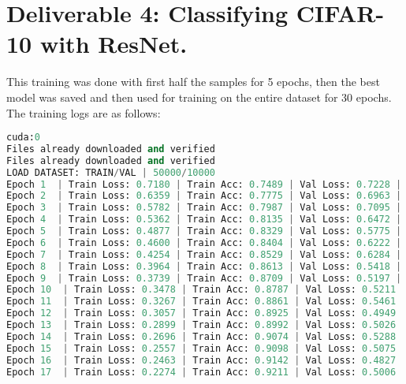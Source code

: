 
\section{Deliverable 4: Classifying CIFAR-10 with ResNet.}


\begin{solve}   
This training was done with first half the samples for 5 epochs, then the best model was saved and then used for training on the entire dataset for 30 epochs. The training logs are as follows:

\begin{lstlisting}[language=python, title=Train Logs, basicstyle=\tiny]
cuda:0
Files already downloaded and verified
Files already downloaded and verified
LOAD DATASET: TRAIN/VAL | 50000/10000
Epoch 1  | Train Loss: 0.7180 | Train Acc: 0.7489 | Val Loss: 0.7228 | Val Acc: 0.7457 | Best Val Loss: 0.7228
Epoch 2  | Train Loss: 0.6359 | Train Acc: 0.7775 | Val Loss: 0.6963 | Val Acc: 0.7637 | Best Val Loss: 0.6963
Epoch 3  | Train Loss: 0.5782 | Train Acc: 0.7987 | Val Loss: 0.7095 | Val Acc: 0.7642 | Best Val Loss: 0.6963
Epoch 4  | Train Loss: 0.5362 | Train Acc: 0.8135 | Val Loss: 0.6472 | Val Acc: 0.7796 | Best Val Loss: 0.6472
Epoch 5  | Train Loss: 0.4877 | Train Acc: 0.8329 | Val Loss: 0.5775 | Val Acc: 0.7978 | Best Val Loss: 0.5775
Epoch 6  | Train Loss: 0.4600 | Train Acc: 0.8404 | Val Loss: 0.6222 | Val Acc: 0.7878 | Best Val Loss: 0.5775
Epoch 7  | Train Loss: 0.4254 | Train Acc: 0.8529 | Val Loss: 0.6284 | Val Acc: 0.7884 | Best Val Loss: 0.5775
Epoch 8  | Train Loss: 0.3964 | Train Acc: 0.8613 | Val Loss: 0.5418 | Val Acc: 0.8159 | Best Val Loss: 0.5418
Epoch 9  | Train Loss: 0.3739 | Train Acc: 0.8709 | Val Loss: 0.5197 | Val Acc: 0.8262 | Best Val Loss: 0.5197
Epoch 10  | Train Loss: 0.3478 | Train Acc: 0.8787 | Val Loss: 0.5211 | Val Acc: 0.8255 | Best Val Loss: 0.5197
Epoch 11  | Train Loss: 0.3267 | Train Acc: 0.8861 | Val Loss: 0.5461 | Val Acc: 0.8205 | Best Val Loss: 0.5197
Epoch 12  | Train Loss: 0.3057 | Train Acc: 0.8925 | Val Loss: 0.4949 | Val Acc: 0.8365 | Best Val Loss: 0.4949
Epoch 13  | Train Loss: 0.2899 | Train Acc: 0.8992 | Val Loss: 0.5026 | Val Acc: 0.8328 | Best Val Loss: 0.4949
Epoch 14  | Train Loss: 0.2696 | Train Acc: 0.9074 | Val Loss: 0.5288 | Val Acc: 0.8284 | Best Val Loss: 0.4949
Epoch 15  | Train Loss: 0.2557 | Train Acc: 0.9098 | Val Loss: 0.5075 | Val Acc: 0.8380 | Best Val Loss: 0.4949
Epoch 16  | Train Loss: 0.2463 | Train Acc: 0.9142 | Val Loss: 0.4827 | Val Acc: 0.8394 | Best Val Loss: 0.4827
Epoch 17  | Train Loss: 0.2274 | Train Acc: 0.9211 | Val Loss: 0.5006 | Val Acc: 0.8459 | Best Val Loss: 0.4827

\end{lstlisting}
\end{solve}
